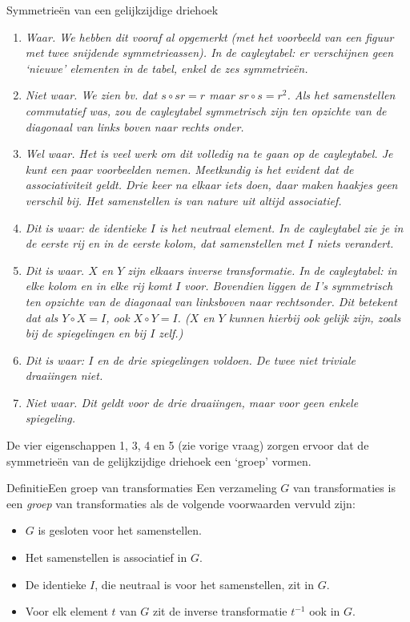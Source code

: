 \begin{lesactiviteit}{Symmetrieën van een gelijkzijdige driehoek}
\begin{vraagenantwoord}[resume]
		\antwoord{}\begin{enumerate}
  
			\item \emph{Waar. We hebben dit vooraf al opgemerkt (met het voorbeeld van een figuur met twee snijdende symmetrieassen). In de cayleytabel: er verschijnen geen `nieuwe' elementen in de tabel, enkel de zes symmetrieën.}
			 \item \emph{Niet waar. We zien bv. dat $s\circ sr=r$ maar $sr\circ s=r^2$. Als het samenstellen commutatief was, zou de cayleytabel symmetrisch zijn ten opzichte van de diagonaal van links boven naar rechts onder.}
			 \item \emph{Wel waar. Het is veel werk om dit volledig na te gaan op de cayleytabel. Je kunt een paar voorbeelden nemen. Meetkundig is het evident dat de associativiteit geldt. Drie keer na elkaar iets doen, daar maken haakjes geen verschil bij. Het samenstellen is van nature uit altijd associatief.}
		    \item \emph{Dit is waar: de identieke $I$ is het neutraal element. In de cayleytabel zie je in de eerste rij en in de eerste kolom, dat samenstellen met $I$ niets verandert.}
		    \item \emph{Dit is waar. $X$ en $Y$ zijn elkaars inverse transformatie. In de cayleytabel: in elke kolom en in elke rij komt $I$ voor. Bovendien liggen de $I$'s symmetrisch ten opzichte van de diagonaal van linksboven naar rechtsonder. Dit betekent dat als $Y\circ X=I$, ook $X\circ Y=I$. ($X$ en $Y$ kunnen hierbij ook gelijk zijn, zoals bij de spiegelingen en bij $I$ zelf.)}
		    \item \emph{Dit is waar: $I$ en de drie spiegelingen voldoen. De twee niet triviale draaiingen niet.}
		    \item \emph{Niet waar. Dit geldt voor de drie draaiingen, maar voor geen enkele spiegeling.}
	    \end{enumerate}
	\end{vraagenantwoord}

	De vier eigenschappen 1, 3, 4 en 5 (zie vorige vraag) zorgen ervoor dat de symmetrieën van de gelijkzijdige driehoek een `groep' vormen.\\
			
	\begin{kader}{Definitie}{Een groep van transformaties}
	Een verzameling $G$ van transformaties is een \emph{groep} van transformaties als de volgende voorwaarden vervuld zijn:
	\begin{itemize}
	    \item $G$ is gesloten voor het samenstellen.
	    \item Het samenstellen is associatief in $G$.
	    \item De identieke $I$, die neutraal is voor het samenstellen, zit in $G$.
	    \item Voor elk element $t$ van $G$ zit de inverse transformatie $t^{-1}$ ook in $G$.
	\end{itemize}
	\end{kader}
	

\end{lesactiviteit}
